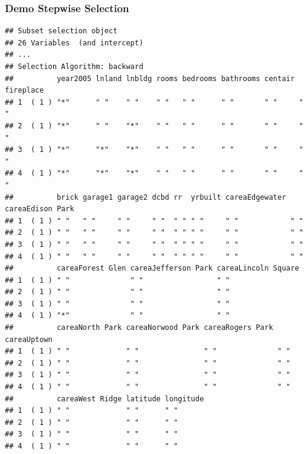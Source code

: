 \documentclass[
  shownotes,
  xcolor={svgnames},
  hyperref={colorlinks,citecolor=DarkBlue,linkcolor=DarkRed,urlcolor=DarkBlue}
  ]{beamer}
\newenvironment{Shaded}{\begin{snugshade}}{\end{snugshade}}
\newcommand{\KeywordTok}[1]{\textcolor[rgb]{0.13,0.29,0.53}{\textbf{#1}}}
\newcommand{\NormalTok}[1]{#1}
\newcommand{\OperatorTok}[1]{\textcolor[rgb]{0.81,0.36,0.00}{\textbf{#1}}}
\begin{document}
\begin{frame}[fragile]
\frametitle{Demo Stepwise Selection}

\begin{scriptsize}
\begin{Shaded}
\end{Shaded}
\end{scriptsize}
\begin{tiny}
\begin{verbatim}
## Subset selection object
## 26 Variables  (and intercept)
## ...
## Selection Algorithm: backward
##          year2005 lnland lnbldg rooms bedrooms bathrooms centair fireplace
## 1  ( 1 ) "*"      " "    " "    " "   " "      " "       " "     " "      
## 2  ( 1 ) "*"      " "    "*"    " "   " "      " "       " "     " "      
## 3  ( 1 ) "*"      "*"    "*"    " "   " "      " "       " "     " "      
## 4  ( 1 ) "*"      "*"    "*"    " "   " "      " "       " "     " "      
##          brick garage1 garage2 dcbd rr  yrbuilt careaEdgewater careaEdison Park
## 1  ( 1 ) " "   " "     " "     " "  " " " "     " "            " "             
## 2  ( 1 ) " "   " "     " "     " "  " " " "     " "            " "             
## 3  ( 1 ) " "   " "     " "     " "  " " " "     " "            " "             
## 4  ( 1 ) " "   " "     " "     " "  " " " "     " "            " "             
##          careaForest Glen careaJefferson Park careaLincoln Square
## 1  ( 1 ) " "              " "                 " "                
## 2  ( 1 ) " "              " "                 " "                
## 3  ( 1 ) " "              " "                 " "                
## 4  ( 1 ) "*"              " "                 " "                
##          careaNorth Park careaNorwood Park careaRogers Park careaUptown
## 1  ( 1 ) " "             " "               " "              " "        
## 2  ( 1 ) " "             " "               " "              " "        
## 3  ( 1 ) " "             " "               " "              " "        
## 4  ( 1 ) " "             " "               " "              " "        
##          careaWest Ridge latitude longitude
## 1  ( 1 ) " "             " "      " "      
## 2  ( 1 ) " "             " "      " "      
## 3  ( 1 ) " "             " "      " "      
## 4  ( 1 ) " "             " "      " "
\end{verbatim}
\end{tiny}

\end{frame}
\end{document}
